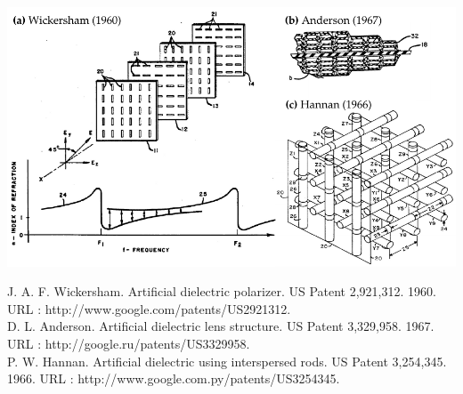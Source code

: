 \documentclass[t]{beamer} \usepackage[english]{babel} \usepackage[utf8]{inputenc} \usetheme{Frankfurt} %
\begin{document}
\begin{frame}[plain]{\tiny{\vspace{-1em}{Early metamaterials -- artificial dielectrics}\vspace{-.5em}}} 		%
\includegraphics[width=\textwidth]{img/patents/mm_patents.pdf} 

\vfill
\tiny{J. A. F. Wickersham. Artificial dielectric polarizer. US Patent 2,921,312. 1960. URL : http://www.google.com/patents/US2921312.\\
D. L. Anderson. Artificial dielectric lens structure. US Patent 3,329,958. 1967. URL : http://google.ru/patents/US3329958.\\
P. W. Hannan. Artificial dielectric using interspersed rods. US Patent 3,254,345. 1966. URL : http://www.google.com.py/patents/US3254345.}
\end{frame} 		%
\end{document}
